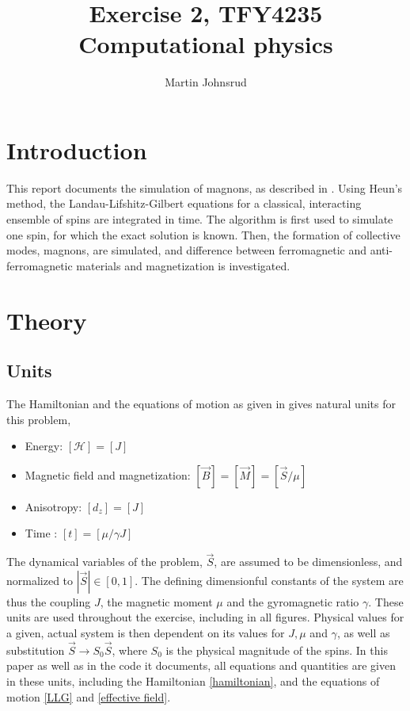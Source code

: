 \documentclass{article}
\title{Exercise 2, TFY4235 Computational physics}
\author{Martin Johnsrud}
\date{}
\begin{document}
    \maketitle
    \section*{Introduction}
    This report documents the simulation of magnons, as described in \cite{exercise}.
    Using Heun's method, the Landau-Lifshitz-Gilbert equations for a classical, interacting ensemble of spins are integrated in time.
    The algorithm is first used to simulate one spin, for which the exact solution is known.
    Then, the formation of collective modes, magnons, are simulated, and difference between ferromagnetic and anti-ferromagnetic materials and magnetization is investigated.

    \section*{Theory}
    \subsection*{Units}

    The Hamiltonian and the equations of motion as given in \cite{exercise} gives natural units for this problem,
    \begin{itemize}
        \item Energy: $[\mathcal H] = [J]$
        \item Magnetic field and magnetization: $[\vec B] = [\vec M] = [\vec S /\mu ]$
        \item Anisotropy: $[d_z] = [J]$
        \item Time : $[t] = [\mu/\gamma J]$
    \end{itemize}
    The dynamical variables of the problem, $ \vec S $, are assumed to be dimensionless, and normalized to $|\vec S|\in[0, 1]$.
     The defining dimensionful constants of the system are thus the coupling $J$, the magnetic moment $\mu$ and the gyromagnetic ratio $\gamma$.
     These units are used throughout the exercise, including in all figures.
     Physical values for a given, actual system is then dependent on its values for $J, \mu$ and $\gamma$, as well as substitution $\vec S \rightarrow S_0 \vec S$, where $S_0$ is the physical magnitude of the spins.
     In this paper as well as in the code it documents, all equations and quantities are given in these units, including the Hamiltonian \autoref{hamiltonian}, and the equations of motion \autoref{LLG} and \autoref{effective field}.
\end{document}
